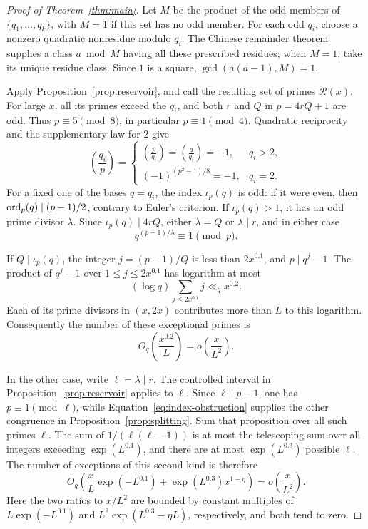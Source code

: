 \begin{proof}[Proof of Theorem~\ref{thm:main}]
Let \(M\) be the product of the odd members of
\(\{q_1,\ldots,q_k\}\), with \(M=1\) if this set has no odd member.
For each odd \(q_i\), choose a nonzero quadratic nonresidue modulo \(q_i\).
The Chinese remainder theorem supplies a class \(a\bmod M\) having all
these prescribed residues; when \(M=1\), take its unique residue class.
Since \(1\) is a square, \(\gcd(a(a-1),M)=1\).

Apply Proposition~\ref{prop:reservoir}, and call the resulting set of
primes \(\mathcal R(x)\).  For large \(x\), all its primes exceed the
\(q_i\), and both \(r\) and \(Q\) in \(p=4rQ+1\) are odd.
Thus \(p\equiv5\pmod8\), in particular \(p\equiv1\pmod4\).
Quadratic reciprocity and the supplementary law for \(2\) give
\[
 \left(\frac{q_i}{p}\right)
 =
 \begin{cases}
 \displaystyle\left(\frac{p}{q_i}\right)
   =\left(\frac{a}{q_i}\right)=-1,&q_i>2,\\[6pt]
 \displaystyle(-1)^{(p^2-1)/8}=-1,&q_i=2.
 \end{cases}
\]
For a fixed one of the bases \(q=q_i\), the index \(\iota_p(q)\) is odd:
if it were even, then
\(\operatorname{ord}_p(q)\mid(p-1)/2\), contrary to Euler's criterion.
If \(\iota_p(q)>1\), it has an odd prime divisor \(\lambda\).  Since
\(\iota_p(q)\mid4rQ\), either \(\lambda=Q\) or \(\lambda\mid r\), and
in either case
\begin{equation}\label{eq:index-obstruction}
        q^{(p-1)/\lambda}\equiv1\pmod p.
\end{equation}

If \(Q\mid\iota_p(q)\), the integer \(j=(p-1)/Q\) is less than
\(2x^{0.1}\), and \(p\mid q^j-1\).  The product of \(q^j-1\) over
\(1\le j\le2x^{0.1}\) has logarithm at most
\[
        (\log q)\sum_{j\le2x^{0.1}}j\ll_q x^{0.2}.
\]
Each of its prime divisors in \((x,2x)\) contributes more than \(L\) to
this logarithm.  Consequently the number of these exceptional primes is
\begin{equation}\label{eq:large-factor-exceptions}
        O_q\!\left(\frac{x^{0.2}}{L}\right)
        =o\!\left(\frac{x}{L^2}\right).
\end{equation}

In the other case, write \(\ell=\lambda\mid r\).  The controlled interval
in Proposition~\ref{prop:reservoir} applies to \(\ell\).  Since
\(\ell\mid p-1\), one has \(p\equiv1\pmod\ell\), while
Equation~\eqref{eq:index-obstruction} supplies the other congruence in
Proposition~\ref{prop:splitting}.  Sum that proposition
over all such primes \(\ell\).  The sum of \(1/(\ell(\ell-1))\) is at most
the telescoping sum over all integers exceeding \(\exp(L^{0.1})\), and
there are at most \(\exp(L^{0.3})\) possible \(\ell\).  The number of
exceptions of this second kind is therefore
\begin{equation}\label{eq:controlled-factor-exceptions}
 O_q\!\left(
       \frac{x}{L}\exp(-L^{0.1})
       +\exp(L^{0.3})x^{1-\eta}
       \right)
 =o\!\left(\frac{x}{L^2}\right).
\end{equation}
Here the two ratios to \(x/L^2\) are bounded by constant multiples of
\(L\exp(-L^{0.1})\) and
\(L^2\exp(L^{0.3}-\eta L)\), respectively, and both tend to zero.


\end{proof}
